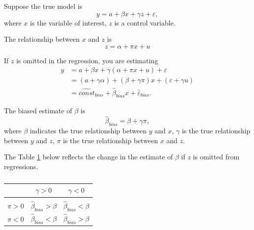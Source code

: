 \documentclass[10pt]{article}
\title{}
\author{}
\date{}
\begin{document}
\maketitle

Suppose the true model is
\begin{equation}
y = a + \beta x + \gamma z + \varepsilon,
\end{equation}
where $ x $ is the variable of interest, $ z $ is a control variable.

The relationship between $ x $ and $ z $ is
\begin{equation}
z = \alpha + \pi x  + u
\end{equation}

If $ z $ is omitted in the regression, you are estimating
\begin{align}
		y &= a + \beta x + \gamma (\alpha + \pi x  + u)  + \varepsilon\\
		&= (a + \gamma \alpha) + (\beta + \gamma \pi)x + (\varepsilon + \gamma u)\\
		&=  \widehat{const}_{bias} +  \widehat{\beta}_{bias} x +  \widehat{\varepsilon}_{bias}. \label{eqn:bias_eq}
\end{align}

The biased estimate of $ \beta $ is 
\begin{equation}
 \widehat{\beta}_{bias} = \beta + \gamma \pi,
\end{equation}
where $ \beta $ indicates the true relationship between $ y $ and $ x $,
$ \gamma $ is the true relationship between $ y $ and $ z $,
$ \pi $ is the true relationship between $ x $ and $ z $.

The Table \ref{table:bias_estimate} below reflects the change in the estimate of $ \beta $ if $ z $ is omitted from 
regressions.



\begin{table}[h!]
\begin{center}
\begin{threeparttable}
\caption{}			
\label{table:bias_estimate}

\begin{tabular}{ccc}
\hline\hline
& $ \gamma > 0 $ & $ \gamma < 0 $\\
 \hline \\[-1.8ex]

 $ \pi > 0 $ & $ \widehat{\beta}_{bias} > \beta $  &$ \widehat{\beta}_{bias} < \beta $ \\
$ \pi < 0 $ & $ \widehat{\beta}_{bias} < \beta $  &$ \widehat{\beta}_{bias} > \beta $ \\

\hline\hline
\end{tabular}


\end{threeparttable}
\end{center}
\end{table}
\end{document}
